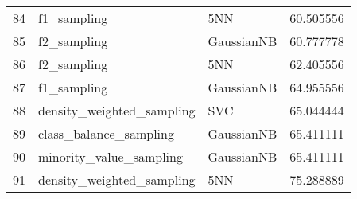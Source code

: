 \begin{tabular}{lllr}
84 & f1_sampling & 5NN & 60.505556 \\
85 & f2_sampling & GaussianNB & 60.777778 \\
86 & f2_sampling & 5NN & 62.405556 \\
87 & f1_sampling & GaussianNB & 64.955556 \\
88 & density_weighted_sampling & SVC & 65.044444 \\
89 & class_balance_sampling & GaussianNB & 65.411111 \\
90 & minority_value_sampling & GaussianNB & 65.411111 \\
91 & density_weighted_sampling & 5NN & 75.288889 \\
\bottomrule
\end{tabular}
